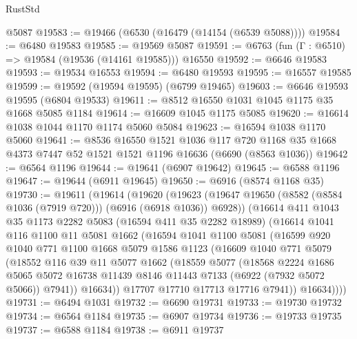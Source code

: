 \begin{lexlean}{RustStd}
\begin{coremodule}
    @5087
@19583 := @19466 (@6530 (@16479 (@14154 (@6539 @5088))))
@19584 := @6480 @19583
@19585 := @19569 @5087
@19591 := @6763 (fun (Γ : @6510) => @19584 (@19536 (@14161 @19585))) @16550
@19592 := @6646 @19583
@19593 := @19534 @16553
@19594 := @6480 @19593
@19595 := @16557 @19585
@19599 := @19592 (@19594 @19595) (@6799 @19465)
@19603 := @6646 @19593 @19595 (@6804 @19533)
@19611 := @8512 @16550 @1031 @1045 @1175 @35 @1668 @5085 @1184
@19614 := @16609 @1045 @1175 @5085
@19620 := @16614 @1038 @1044 @1170 @1174 @5060 @5084
@19623 := @16594 @1038 @1170 @5060
@19641 := @8536
    @16550
    @1521
    @1036
    @117
    @720
    @1168
    @35
    @1668
    @4373
    @7447
    @52
    @1521
    @1521
    @1196
    @16636
    (@6690 (@8563 @1036))
@19642 := @6564 @1196
@19644 := @19641 (@6907 @19642)
@19645 := @6588 @1196
@19647 := @19644 (@6911 @19645)
@19650 := @6916 (@8574 @1168 @35)
@19730 := @19611
    (@19614
      (@19620
        (@19623 (@19647 @19650 (@8582 (@8584 @1036 (@7919 @720))) (@6916 (@6918 @1036)) @6928))
        (@16614
          @411
          @1043
          @35
          @1173
          @2282
          @5083
          (@16594 @411 @35 @2282 @18989)
          (@16614
            @1041
            @116
            @1100
            @11
            @5081
            @1662
            (@16594
              @1041
              @1100
              @5081
              (@16599
                @920
                @1040
                @771
                @1100
                @1668
                @5079
                @1586
                @1123
                (@16609
                  @1040
                  @771
                  @5079
                  (@18552
                    @116
                    @39
                    @11
                    @5077
                    @1662
                    (@18559
                      @5077
                      (@18568
                        @2224
                        @1686
                        @5065
                        @5072
                        @16738
                        @11439
                        @8146
                        @11443
                        @7133
                        (@6922 (@7932 @5072 @5066))
                        @7941))
                    @16634))
                @17707
                @17710
                @17713
                @17716
                @7941))
            @16634))))
@19731 := @6494 @1031
@19732 := @6690 @19731
@19733 := @19730 @19732
@19734 := @6564 @1184
@19735 := @6907 @19734
@19736 := @19733 @19735
@19737 := @6588 @1184
@19738 := @6911 @19737

\end{coremodule}
\end{lexlean}
